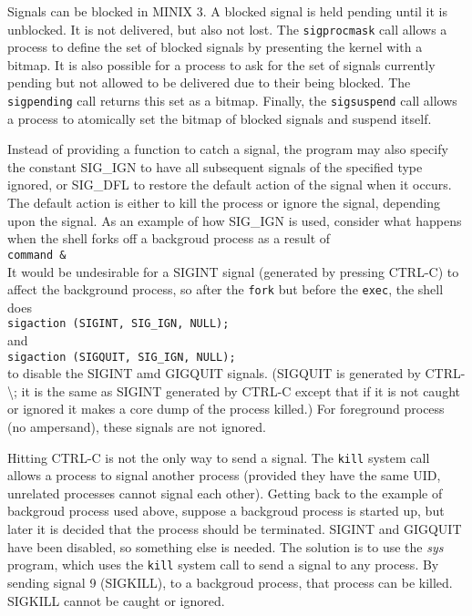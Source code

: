 \documentclass{book}
\newcommand {\sys} [1] {\textsl{#1}}
\newcommand {\cmd} [1] {\texttt{#1}}
\begin{document}
Signals can be blocked in MINIX 3.
A blocked signal is held pending until it is unblocked.
It is not delivered, but also not lost.
The \cmd{sigprocmask} call allows a process to define the set of blocked signals by presenting the kernel with a bitmap.
It is also possible for a process to ask for the set of signals currently pending but not allowed to be delivered due to their being blocked.
The \cmd{sigpending} call returns this set as a bitmap.
Finally, the \cmd{sigsuspend} call allows a process to atomically set the bitmap of blocked signals and suspend itself.

Instead of providing a function to catch a signal, the program may also specify the constant SIG\_IGN 
to have all subsequent signals of the specified type ignored, or SIG\_DFL to restore the default action of the signal when it occurs.
The default action is either to kill the process or ignore the signal, depending upon the signal.
As an example of how SIG\_IGN is used, consider what happens when the shell forks off a backgroud process as a result of\\
\cmd{command \&}\\
It would be undesirable for a SIGINT signal (generated by pressing CTRL-C) to affect the background process,
so after the \cmd{fork} but before the \cmd{exec}, the shell does\\
\cmd{sigaction (SIGINT, SIG\_IGN, NULL);}\\
and\\
\cmd{sigaction (SIGQUIT, SIG\_IGN, NULL);}\\
to disable the SIGINT amd GIGQUIT signals.
(SIGQUIT is generated by CTRL-\textbackslash; it is the same as SIGINT generated by CTRL-C 
except that if it is not caught or ignored it makes a core dump of the process killed.)
For foreground process (no ampersand), these signals are not ignored.

Hitting CTRL-C is not the only way to send a signal.
The \cmd{kill} system call allows a process to signal another process 
(provided they have the same UID, unrelated processes cannot signal each other).
Getting back to the example of backgroud process used above, suppose a backgroud process is started up, 
but later it is decided that the process should be terminated.
SIGINT and GIGQUIT have been disabled, so something else is needed.
The solution is to use the \sys{sys} program, which uses the \cmd{kill} system call to send a signal to any process.
By sending signal 9 (SIGKILL), to a backgroud process, that process can be killed.
SIGKILL cannot be caught or ignored.
\end{document}
